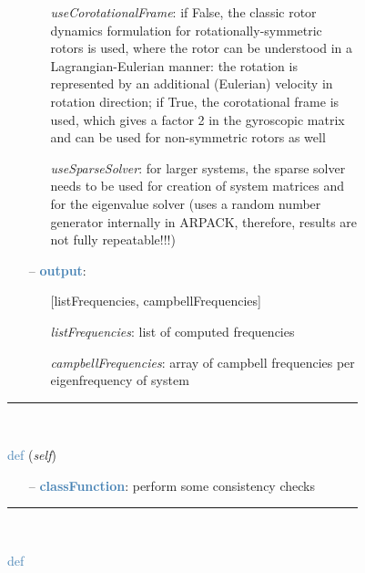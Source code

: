 \begin{itemize}[leftmargin=1.4cm]
\begin{itemize}[leftmargin=0.5cm]
\begin{itemize}[leftmargin=1.4cm]
\begin{itemize}[leftmargin=1.4cm]
\begin{itemize}[leftmargin=0.5cm]
\begin{itemize}[leftmargin=0.7cm]
\begin{itemize}[leftmargin=1.2cm]
    \item[] {\it   useCorotationalFrame}: if False, the classic rotor dynamics formulation for rotationally-symmetric rotors is used, where the rotor can be understood in a Lagrangian-Eulerian manner: the rotation is represented by an additional (Eulerian) velocity in rotation direction; if True, the corotational frame is used, which gives a factor 2 in the gyroscopic matrix and can be used for non-symmetric rotors as well
    \item[] {\it   useSparseSolver}: for larger systems, the sparse solver needs to be used for creation of system matrices and for the eigenvalue solver (uses a random number generator internally in ARPACK, therefore, results are not fully repeatable!!!)
  \end{itemize}
  \item[--]  \textcolor{steelblue}{\bf output}: \vspace{-6pt}
  \begin{itemize}[leftmargin=1.2cm]
\setlength{\itemindent}{-0.7cm}
    \item[] [listFrequencies, campbellFrequencies]
    \item[] {\it   listFrequencies}: list of computed frequencies
    \item[] {\it   campbellFrequencies}: array of campbell frequencies per eigenfrequency of system
  \end{itemize}
\vspace{12pt}\end{itemize}
%
\noindent\rule{8cm}{0.75pt}\vspace{1pt} \\ 
\begin{flushleft}
\noindent \textcolor{steelblue}{def {\bf {}}}\label{sec:FEM:FEMinterface:CheckConsistency}
({\it self})
\end{flushleft}
\setlength{\itemindent}{0.7cm}
\begin{itemize}[leftmargin=0.7cm]
  \item[--]  \textcolor{steelblue}{\bf classFunction}: perform some consistency checks\vspace{12pt}\end{itemize}
%
\noindent\rule{8cm}{0.75pt}\vspace{1pt} \\ 
\begin{flushleft}
\noindent \textcolor{steelblue}{def {\bf {}}}\label{sec:FEM:FEMinterface:ReadMassMatrixFromAnsys}

\end{flushleft}
\end{itemize}
\end{itemize}
\end{itemize}
\end{itemize}
\end{itemize}
